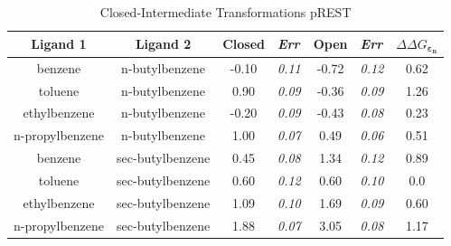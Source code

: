 \documentclass[T4paper.tex]{subfiles}
\begin{document}
\begin{table}[!htb]
\centering
\caption{Closed-Intermediate Transformations pREST}
\label{tbl:C-I_pREST}
\begin{tabular}{|c|c|c|l|c|l|c|}
\hline
\textbf{Ligand 1}                       & \textbf{Ligand 2}                        & {\color[HTML]{800080} \textbf{Closed}} & {\color[HTML]{800080} \textit{Err}} & {\color[HTML]{008000} \textbf{Open}} & {\color[HTML]{008000} \textit{Err}} & \textbf{$\Delta\Delta G_{\boldsymbol{\varepsilon_n}}$}            \\ \hline
\cellcolor[HTML]{800080}benzene         & \cellcolor[HTML]{00FFFF}n-butylbenzene   & -0.10                                   & \textit{0.11}                       & -0.72                                & \textit{0.12}                       & \cellcolor[HTML]{9AFF99}0.62 \\ \hline
\cellcolor[HTML]{800080}toluene         & \cellcolor[HTML]{00FFFF}n-butylbenzene   & 0.90                                  & \textit{0.09}                       & -0.36                                & \textit{0.09}                       & \cellcolor[HTML]{FFCCC9}1.26 \\ \hline
\cellcolor[HTML]{800080}ethylbenzene    & \cellcolor[HTML]{00FFFF}n-butylbenzene   & -0.20                                   & \textit{0.09}                       & -0.43                                & \textit{0.08}                       & \cellcolor[HTML]{9AFF99}0.23 \\ \hline
\cellcolor[HTML]{800080}n-propylbenzene & \cellcolor[HTML]{00FFFF}n-butylbenzene   & 1.00                                  & \textit{0.07}                       & 0.49                                 & \textit{0.06}                       & \cellcolor[HTML]{9AFF99}0.51 \\ \hline
\cellcolor[HTML]{800080}benzene         & \cellcolor[HTML]{00FFFF}sec-butylbenzene & 0.45                                   & \textit{0.08}                       & 1.34                                 & \textit{0.12}                       & \cellcolor[HTML]{9AFF99}0.89 \\ \hline
\cellcolor[HTML]{800080}toluene         & \cellcolor[HTML]{00FFFF}sec-butylbenzene & 0.60                                   & \textit{0.12}                       & 0.60                                 & \textit{0.10}                       & \cellcolor[HTML]{9AFF99}0.0 \\ \hline
\cellcolor[HTML]{800080}ethylbenzene    & \cellcolor[HTML]{00FFFF}sec-butylbenzene & 1.09                                   & \textit{0.10}                       & 1.69                                 & \textit{0.09}                       & \cellcolor[HTML]{9AFF99}0.60 \\ \hline
\cellcolor[HTML]{800080}n-propylbenzene & \cellcolor[HTML]{00FFFF}sec-butylbenzene & 1.88                                   & \textit{0.07}                       & 3.05                                 & \textit{0.08}                       & \cellcolor[HTML]{FFCCC9}1.17 \\ \hline
\end{tabular}
\end{table}
\end{document}
